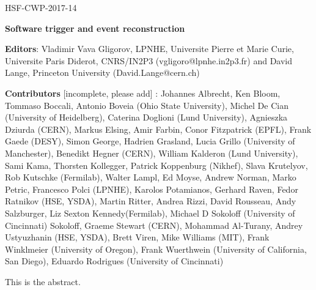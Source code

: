 \begin{flushright}
HSF-CWP-2017-14
\end{flushright}

\Large
\begin{center}
{\bf Software trigger and event reconstruction}
\end{center}
\vskip 1cm

\normalsize

\hangindent=1cm
{\bf Editors}: Vladimir Vava Gligorov, LPNHE, Universite Pierre et Marie Curie, Universite Paris Diderot, CNRS/IN2P3 (vgligoro@lpnhe.in2p3.fr) and David Lange, Princeton University (David.Lange@cern.ch) 

\vskip 0.2cm
\hangindent=1cm
{\bf Contributors} [incomplete, please add] : Johannes Albrecht, Ken Bloom, Tommaso Boccali, Antonio Boveia (Ohio State University), Michel De Cian (University of Heidelberg), Caterina Doglioni (Lund University), Agnieszka Dziurda (CERN), Markus Elsing, Amir Farbin, Conor Fitzpatrick (EPFL), Frank Gaede (DESY), Simon George, Hadrien Grasland, Lucia Grillo (University of Manchester), Benedikt Hegner (CERN), William Kalderon (Lund University), Sami Kama, Thorsten Kollegger, Patrick Koppenburg (Nikhef), Slava Krutelyov, Rob Kutschke (Fermilab), Walter Lampl, Ed Moyse, Andrew Norman, Marko Petric, Francesco Polci (LPNHE), Karolos Potamianos, Gerhard Raven, Fedor Ratnikov (HSE, YSDA), Martin Ritter,  Andrea Rizzi, David Rousseau, Andy Salzburger, Liz Sexton Kennedy(Fermilab), Michael D Sokoloff (University of Cincinnati) Sokoloff, Graeme Stewart (CERN), Mohammad Al-Turany,  Andrey Ustyuzhanin (HSE, YSDA), Brett Viren, Mike Williams (MIT), Frank Winklmeier (University of Oregon), Frank Wuerthwein (University of California, San Diego), Eduardo Rodrigues (University of Cincinnati)

\vskip 1cm


\hangindent=2cm
This is the abstract.
